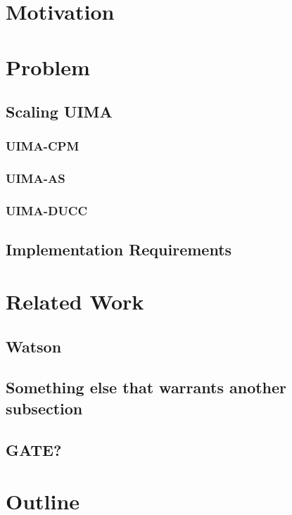 \section{Motivation}



\section{Problem}
\subsection{Scaling UIMA}
\subsubsection{UIMA-CPM}
\subsubsection{UIMA-AS}
\subsubsection{UIMA-DUCC}
\subsection{Implementation Requirements}


\section{Related Work}

\subsection{Watson}

\subsection{Something else that warrants another subsection}

\subsection{GATE?}

\section{Outline}